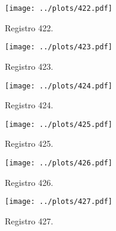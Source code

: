 \documentclass{article}
\begin{document}
\begin{figure}[h]
\centering
\texttt{[image: ../plots/422.pdf]}
\caption{Registro 422.}
\end{figure}

\begin{figure}[h]
\centering
\texttt{[image: ../plots/423.pdf]}
\caption{Registro 423.}
\end{figure}

\begin{figure}[h]
\centering
\texttt{[image: ../plots/424.pdf]}
\caption{Registro 424.}
\end{figure}

\begin{figure}[h]
\centering
\texttt{[image: ../plots/425.pdf]}
\caption{Registro 425.}
\end{figure}

\begin{figure}[h]
\centering
\texttt{[image: ../plots/426.pdf]}
\caption{Registro 426.}
\end{figure}

\begin{figure}[h]
\centering
\texttt{[image: ../plots/427.pdf]}
\caption{Registro 427.}
\end{figure}
\end{document}
